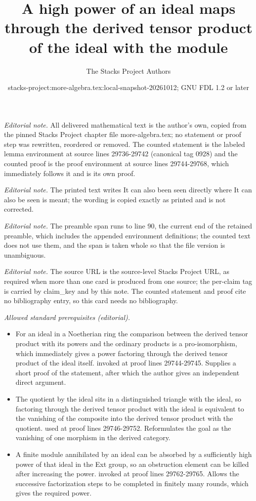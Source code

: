\documentclass[10pt,a4paper]{amsart}
\title{A high power of an ideal maps through the derived tensor product of the ideal with the module}
\author{The Stacks Project Authors}
\date{stacks-project:more-algebra.tex:local-snapshot-20261012; GNU FDL 1.2 or later}
\theoremstyle{plain}
\theoremstyle{definition}
\theoremstyle{remark}
\numberwithin{equation}{subsection}
\begin{document}
\maketitle
\setcounter{subsection}{1}
\noindent\textit{Editorial note.} All delivered mathematical text is the author's own, copied from the pinned Stacks Project chapter file more-algebra.tex; no statement or proof step was rewritten, reordered or removed. The counted statement is the labeled lemma environment at source lines 29736-29742 (canonical tag 0928) and the counted proof is the proof environment at source lines 29744-29768, which immediately follows it and is its own proof.\par\medskip
\noindent\textit{Editorial note.} The printed text writes It can also been seen directly where It can also be seen is meant; the wording is copied exactly as printed and is not corrected.\par\medskip
\noindent\textit{Editorial note.} The preamble span runs to line 90, the current end of the retained preamble, which includes the appended environment definitions; the counted text does not use them, and the span is taken whole so that the file version is unambiguous.\par\medskip
\noindent\textit{Editorial note.} The source URL is the source-level Stacks Project URL, as required when more than one card is produced from one source; the per-claim tag is carried by claim\_key and by this note. The counted statement and proof cite no bibliography entry, so this card needs no bibliography.\par\medskip
\noindent\textit{Allowed standard prerequisites (editorial).}\begin{itemize}
\item For an ideal in a Noetherian ring the comparison between the derived tensor product with its powers and the ordinary products is a pro-isomorphism, which immediately gives a power factoring through the derived tensor product of the ideal itself. invoked at proof lines 29744-29745. Supplies a short proof of the statement, after which the author gives an independent direct argument.
\item The quotient by the ideal sits in a distinguished triangle with the ideal, so factoring through the derived tensor product with the ideal is equivalent to the vanishing of the composite into the derived tensor product with the quotient. used at proof lines 29746-29752. Reformulates the goal as the vanishing of one morphism in the derived category.
\item A finite module annihilated by an ideal can be absorbed by a sufficiently high power of that ideal in the Ext group, so an obstruction element can be killed after increasing the power. invoked at proof lines 29762-29765. Allows the successive factorization steps to be completed in finitely many rounds, which gives the required power.
\end{itemize}\medskip
\end{document}
